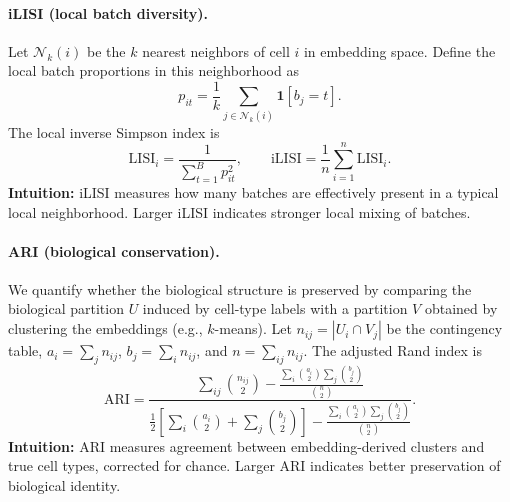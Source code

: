\paragraph{iLISI (local batch diversity).}
Let $\mathcal{N}_k(i)$ be the $k$ nearest neighbors of cell $i$ in embedding space.
Define the local batch proportions in this neighborhood as
\begin{equation}
  p_{it} = \frac{1}{k}\sum_{j\in\mathcal{N}_k(i)} \mathbf{1}[b_j=t].
\end{equation}
The local inverse Simpson index is
\begin{equation}
  \mathrm{LISI}_i = \frac{1}{\sum_{t=1}^B p_{it}^2},\qquad \mathrm{iLISI}=\frac{1}{n}\sum_{i=1}^n \mathrm{LISI}_i.
\end{equation}
\textbf{Intuition:} iLISI measures how many batches are effectively present in a typical local neighborhood. Larger iLISI indicates stronger local mixing of batches.

\paragraph{ARI (biological conservation).}
We quantify whether the biological structure is preserved by comparing the biological partition $U$ induced by cell-type labels with a partition $V$ obtained by clustering the embeddings (e.g., $k$-means).
Let $n_{ij}=|U_i\cap V_j|$ be the contingency table, $a_i=\sum_j n_{ij}$, $b_j=\sum_i n_{ij}$, and $n=\sum_{ij}n_{ij}$.
The adjusted Rand index is
\begin{equation}
  \mathrm{ARI}=
  \frac{\sum_{ij}\binom{n_{ij}}{2} - \frac{\sum_i\binom{a_i}{2}\sum_j\binom{b_j}{2}}{\binom{n}{2}}}
  {\frac{1}{2}\left[\sum_i\binom{a_i}{2}+\sum_j\binom{b_j}{2}\right] - \frac{\sum_i\binom{a_i}{2}\sum_j\binom{b_j}{2}}{\binom{n}{2}}}.
\end{equation}
\textbf{Intuition:} ARI measures agreement between embedding-derived clusters and true cell types, corrected for chance. Larger ARI indicates better preservation of biological identity.

